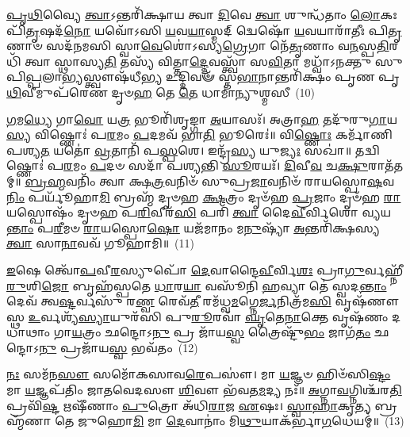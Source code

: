 {\anuvakamend[{𑌯𑌂 𑌦𑌶᳴ 𑌚}]}%

\-\ul{𑌪𑍃}\-\-\ul{𑌥𑌿}\-𑌵𑍍𑌯𑍈 \ul{𑌤𑍍𑌵𑌾}\-\-𑌽𑌨𑍍𑌤𑌰𑌿᳴𑌕𑍍𑌷𑌾𑌯 𑌤𑍍𑌵𑌾 \ul{𑌦𑌿}\-𑌵𑍇 \ul{𑌤𑍍𑌵𑌾} 𑌶𑍁𑌨𑍍𑌧᳴𑌤𑌾𑌂 \ul{𑌲𑍋}\-𑌕𑌃 𑌪𑌿᳴\-\ul{𑌤𑍃}\-𑌷𑌦᳴\-\ul{𑌨𑍋} 𑌯𑌵𑍋᳴\-𑌽𑌸𑌿 \ul{𑌯}\-𑌵\-\ul{𑌯𑌾}\-𑌸𑍍𑌮𑌦𑍍 𑌦𑍍𑌵𑍇𑌷𑍋᳴ \ul{𑌯}\-𑌵𑌯𑌾𑌰𑌾᳴𑌤𑍀𑌃 𑌪𑌿\-\ul{𑌤𑍃}\-𑌣𑌾𑍞 𑌸𑌦᳴𑌨𑌮𑌸𑌿 𑌸𑍍𑌵𑌾\-\ul{𑌵𑍇}\-𑌶𑍋॑\-𑌽𑌸𑍍𑌯\-\ul{𑌗𑍍𑌰𑍇}\-𑌗𑌾 𑌨𑍇᳴\-\ul{𑌤𑍃}\-𑌣𑌾𑌂 𑌵\-\ul{𑌨}\-𑌸𑍍𑌪\-\ul{𑌤𑌿}\-𑌰𑌧𑌿᳴ 𑌤𑍍𑌵𑌾 𑌸𑍍𑌥𑌾𑌸𑍍𑌯\-\ul{𑌤𑌿} 𑌤𑌸𑍍𑌯᳴ 𑌵𑌿𑌤𑍍𑌤𑌾\-\ul{𑌦𑍍𑌦𑍇}\-𑌵𑌸𑍍𑌤𑍍𑌵𑌾᳴ 𑌸\-\ul{𑌵𑌿}\-𑌤𑌾 𑌮𑌧𑍍𑌵𑌾᳴\-𑌽𑌨𑌕𑍍𑌤𑍁 𑌸𑍁𑌪𑌿\-\ul{𑌪𑍍𑌪}\-𑌲𑌾\-\ul{𑌭𑍍𑌯}\-𑌸𑍍𑌤𑍍𑌵𑍗𑌷᳴𑌧𑍀\-\ul{𑌭𑍍𑌯} 𑌉𑌦𑍍𑌦𑌿𑌵𑍟᳴ 𑌸𑍍𑌤\-\ul{𑌭𑌾}\-𑌨𑌾𑌨𑍍𑌤𑌰𑌿᳴𑌕𑍍𑌷𑌂 𑌪𑍃𑌣 𑌪𑍃\-\ul{𑌥𑌿}\-𑌵𑍀𑌮𑍁𑌪᳴𑌰𑍇𑌣 𑌦𑍃𑍞\-\ul{𑌹} 𑌤𑍇 \ul{𑌤𑍇} 𑌧𑌾𑌮𑌾॑𑌨𑍍𑌯𑍁𑌶𑍍𑌮𑌸𑍀~(10)

\-\ul{𑌗}\-𑌮\-\ul{𑌧𑍍𑌯𑍇} 𑌗𑌾\-\ul{𑌵𑍋} 𑌯\-\ul{𑌤𑍍𑌰} 𑌭𑍂𑌰𑌿᳴𑌶𑍃𑌙𑍍𑌗𑌾 \ul{𑌅}\-𑌯𑌾𑌸𑌃᳴। 𑌅𑌤𑍍𑌰𑌾\-\ul{𑌹} 𑌤𑌦𑍁᳴𑌰𑍁\-\ul{𑌗𑌾}\-𑌯\-\ul{𑌸𑍍𑌯} 𑌵𑌿𑌷𑍍𑌣𑍋𑌃॑ 𑌪\-\ul{𑌰}\-𑌮𑌂 \ul{𑌪}\-𑌦𑌮𑌵᳴ 𑌭𑌾\-\ul{𑌤𑌿} 𑌭𑍂𑌰𑍇𑌃॑॥ 𑌵𑌿\-\ul{𑌷𑍍𑌣𑍋𑌃} 𑌕𑌰𑍍𑌮𑌾᳴𑌣𑌿 𑌪𑌶𑍍𑌯\-\ul{𑌤} 𑌯𑌤𑍋॑ \ul{𑌵𑍍𑌰}\-𑌤𑌾𑌨𑌿᳴ 𑌪\-\ul{𑌸𑍍𑌪}\-𑌶𑍇। 𑌇𑌨𑍍𑌦𑍍𑌰᳴\-\ul{𑌸𑍍𑌯} 𑌯𑍁\-\ul{𑌜𑍍𑌯𑌃} 𑌸𑌖𑌾॑॥ 𑌤𑌦𑍍𑌵𑌿𑌷𑍍𑌣𑍋𑌃॑ 𑌪\-\ul{𑌰}\-𑌮𑌂 \ul{𑌪}\-𑌦𑍞 𑌸𑌦𑌾᳴ 𑌪𑌶𑍍𑌯𑌨𑍍𑌤𑌿 \ul{𑌸𑍂}\-𑌰𑌯𑌃᳴। \ul{𑌦𑌿}\-𑌵𑍀\-\ul{𑌵} 𑌚\-\ul{𑌕𑍍𑌷𑍁}\-𑌰𑌾𑌤᳴𑌤𑌮𑍍॥ \ul{𑌬𑍍𑌰}\-\-\ul{𑌹𑍍𑌮}\-𑌵𑌨𑌿𑌂᳴ 𑌤𑍍𑌵𑌾 𑌕𑍍𑌷\-\ul{𑌤𑍍𑌰}\-𑌵𑌨𑌿𑍞᳴ 𑌸𑍁𑌪𑍍𑌰\-\ul{𑌜𑌾}\-𑌵𑌨𑌿𑍞᳴ 𑌰𑌾𑌯𑌸𑍍𑌪𑍋\-\ul{𑌷}\-𑌵\-\ul{𑌨𑌿𑌂} 𑌪𑌰𑍍𑌯𑍂᳴𑌹𑌾\-\ul{𑌮𑌿} 𑌬𑍍𑌰𑌹𑍍𑌮᳴ 𑌦𑍃𑍞𑌹 \ul{𑌕𑍍𑌷}\-𑌤𑍍𑌰𑌂 𑌦𑍃𑍞᳴𑌹 \ul{𑌪𑍍𑌰}\-𑌜𑌾𑌂 𑌦𑍃𑍞᳴𑌹 \ul{𑌰𑌾}\-𑌯𑌸𑍍𑌪𑍋𑌷𑌂᳴ 𑌦𑍃𑍞𑌹 𑌪\-\ul{𑌰𑌿}\-𑌵𑍀𑌰᳴\-\ul{𑌸𑌿} 𑌪𑌰𑌿᳴ \ul{𑌤𑍍𑌵𑌾} 𑌦𑍈\-\ul{𑌵𑍀}\-𑌰𑍍𑌵𑌿𑌶𑍋॑ 𑌵𑍍𑌯𑌯\-\ul{𑌨𑍍𑌤𑌾𑌂} 𑌪\-\ul{𑌰𑍀}\-𑌮𑍞 \ul{𑌰𑌾}\-𑌯𑌸𑍍𑌪𑍋\-\ul{𑌷𑍋} 𑌯𑌜᳴𑌮𑌾𑌨𑌂 𑌮\-\ul{𑌨𑍁}\-𑌷𑍍𑌯𑌾᳴ \ul{𑌅}\-𑌨𑍍𑌤𑌰𑌿᳴𑌕𑍍𑌷𑌸𑍍𑌯 \ul{𑌤𑍍𑌵𑌾} 𑌸𑌾\-\ul{𑌨𑌾}\-𑌵𑌵᳴ 𑌗𑍂𑌹𑌾𑌮𑌿॥~(11)

{\anuvakamend[{\-\ul{𑌉}\-\-\ul{𑌶𑍍𑌮}\-\-\ul{𑌸𑍀} 𑌪𑍋\-\ul{𑌷}\-𑌮𑍇\-\ul{𑌕𑌾}\-𑌨𑍍𑌨𑌵𑌿𑍞᳴\-\ul{𑌶}\-𑌤𑌿𑌶𑍍𑌚᳴}]}%

\-\ul{𑌇}\-𑌷𑍇 𑌤𑍍𑌵𑍋᳴\-\ul{𑌪}\-𑌵𑍀\-\ul{𑌰}\-𑌸𑍍𑌯𑍁𑌪𑍋᳴ \ul{𑌦𑍇}\-𑌵𑌾𑌨𑍍𑌦𑍈\-\ul{𑌵𑍀}\-𑌰𑍍𑌵𑌿\-\ul{𑌶𑌃} 𑌪𑍍𑌰𑌾\-\ul{𑌗𑍁}\-𑌰𑍍𑌵𑌹𑍍𑌨𑍀᳴\-\ul{𑌰𑍁}\-𑌶𑌿\-\ul{𑌜𑍋} 𑌬𑍃𑌹᳴𑌸𑍍𑌪𑌤𑍇 \ul{𑌧𑌾}\-𑌰\-\ul{𑌯𑌾} 𑌵𑌸𑍂᳴𑌨𑌿 \ul{𑌹}\-𑌵𑍍𑌯𑌾 𑌤𑍇॑ 𑌸𑍍𑌵𑌦\-\ul{𑌨𑍍𑌤𑌾𑌂} 𑌦𑍇𑌵᳴ 𑌤𑍍𑌵\-\ul{𑌷𑍍𑌟}\-𑌰𑍍𑌵𑌸𑍁᳴ 𑌰\-\ul{𑌣𑍍𑌵} 𑌰𑍇𑌵᳴\-\ul{𑌤𑍀} 𑌰𑌮᳴𑌧𑍍𑌵\-\ul{𑌮}\-𑌗𑍍𑌨𑍇\-\ul{𑌰𑍍𑌜}\-𑌨𑌿𑌤𑍍𑌰᳴𑌮\-\ul{𑌸𑌿} 𑌵𑍃𑌷᳴𑌣𑍗 𑌸𑍍𑌥 \ul{𑌉}\-𑌰𑍍𑌵𑌶𑍍𑌯᳴\-\ul{𑌸𑍍𑌯𑌾}\-𑌯𑍁𑌰᳴𑌸𑌿 𑌪𑍁\-\ul{𑌰𑍂}\-𑌰𑌵𑌾᳴ \ul{𑌘𑍃}\-𑌤𑍇\-\ul{𑌨𑌾}\-𑌕𑍍𑌤𑍇 𑌵𑍃𑌷᳴𑌣𑌂 𑌦𑌧𑌾𑌥𑌾𑌂 𑌗𑌾\-\ul{𑌯}\-𑌤𑍍𑌰𑌂 𑌛𑌨𑍍𑌦𑍋\-𑌽\-\ul{𑌨𑍁} 𑌪𑍍𑌰 𑌜𑌾᳴𑌯\-\ul{𑌸𑍍𑌵} 𑌤𑍍𑌰𑍈𑌷𑍍𑌟𑍁᳴\-\ul{𑌭𑌂} 𑌜𑌾𑌗᳴\-\ul{𑌤𑌂} 𑌛𑌨𑍍𑌦𑍋\-𑌽\-\ul{𑌨𑍁} 𑌪𑍍𑌰𑌜𑌾᳴𑌯\-\ul{𑌸𑍍𑌵} 𑌭𑌵᳴𑌤𑌂~(12)

\-\ul{𑌨𑌃} 𑌸𑌮᳴𑌨\-\ul{𑌸𑍗} 𑌸𑌮𑍋᳴𑌕𑌸𑌾𑌵\-\ul{𑌰𑍇}\-𑌪𑌸𑍗॑। 𑌮𑌾 \ul{𑌯}\-𑌜𑍍𑌞𑍞 𑌹𑌿𑍞᳴𑌸𑌿\-\ul{𑌷𑍍𑌟𑌂} 𑌮𑌾 \ul{𑌯}\-𑌜𑍍𑌞𑌪᳴𑌤𑌿𑌂 𑌜𑌾𑌤𑌵𑍇𑌦𑌸𑍗 \ul{𑌶𑌿}\-𑌵𑍗 𑌭᳴𑌵𑌤\-\ul{𑌮}\-𑌦𑍍𑌯 𑌨𑌃᳴॥ \ul{𑌅}\-𑌗𑍍𑌨𑌾\-\ul{𑌵}\-𑌗𑍍𑌨𑌿𑌶𑍍𑌚᳴𑌰\-\ul{𑌤𑌿} 𑌪𑍍𑌰𑌵𑌿᳴\-\ul{𑌷𑍍𑌟} 𑌋𑌷𑍀᳴𑌣𑌾𑌂 \ul{𑌪𑍁}\-𑌤𑍍𑌰𑍋 𑌅᳴𑌧𑌿\-\ul{𑌰𑌾}\-𑌜 \ul{𑌏}\-𑌷𑌃। \ul{𑌸𑍍𑌵𑌾}\-\-\ul{𑌹𑌾}\-𑌕𑍃\-\ul{𑌤𑍍𑌯} 𑌬𑍍𑌰𑌹𑍍𑌮᳴𑌣𑌾 𑌤𑍇 𑌜𑍁𑌹𑍋\-\ul{𑌮𑌿} 𑌮𑌾 \ul{𑌦𑍇}\-𑌵𑌾𑌨𑌾𑌂॑ 𑌮𑌿\-\ul{𑌥𑍁}\-𑌯𑌾𑌕᳴𑌰𑍍𑌭𑌾\-\ul{𑌗}\-𑌧𑍇𑌯𑌮𑍍॑॥~(13)

